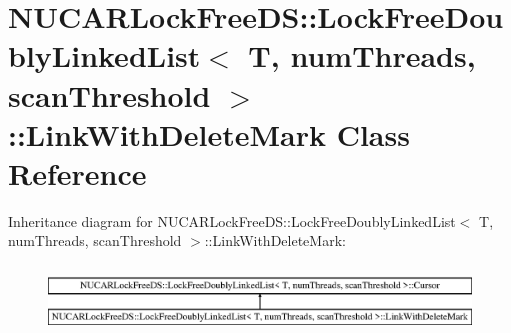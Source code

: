 \hypertarget{class_n_u_c_a_r_lock_free_d_s_1_1_lock_free_doubly_linked_list_1_1_link_with_delete_mark}{}\section{N\+U\+C\+A\+R\+Lock\+Free\+DS\+:\+:Lock\+Free\+Doubly\+Linked\+List$<$ T, num\+Threads, scan\+Threshold $>$\+:\+:Link\+With\+Delete\+Mark Class Reference}
\label{class_n_u_c_a_r_lock_free_d_s_1_1_lock_free_doubly_linked_list_1_1_link_with_delete_mark}
Inheritance diagram for N\+U\+C\+A\+R\+Lock\+Free\+DS\+:\+:Lock\+Free\+Doubly\+Linked\+List$<$ T, num\+Threads, scan\+Threshold $>$\+:\+:Link\+With\+Delete\+Mark\+:\begin{figure}[H]
\begin{center}
\leavevmode
\includegraphics[height=1.839080cm]{class_n_u_c_a_r_lock_free_d_s_1_1_lock_free_doubly_linked_list_1_1_link_with_delete_mark}
\end{center}
\end{figure}
